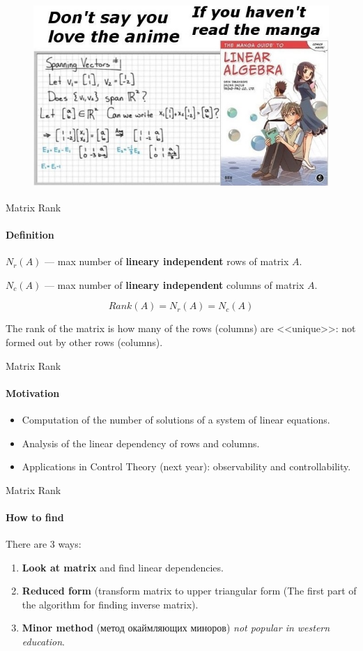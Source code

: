 \documentclass[aspectratio=169,notes]{beamer}
\begin{document}
\begin{frame}[t]{}
\framesubtitle{}
    \begin{figure}[H]
        \centering\includegraphics[height=7cm,width=1\textwidth,keepaspectratio]{agla_manga.jpeg}
        \label{fig:agla_manga.jpeg}
    \end{figure}
\end{frame}

\begin{frame}[t]{Matrix Rank}
\framesubtitle{Definition}
    \textbf{$N_r(A)$} --- max number of \textbf{lineary independent} rows of matrix $A$.

    \textbf{$N_c(A)$} --- max number of \textbf{lineary independent} columns of matrix $A$.

    \begin{equation*}
        Rank(A) = N_r(A) = N_c(A)
    \end{equation*}
\bigskip

    \centering
    The rank of the matrix is how many of the rows (columns) are <<unique>>: not formed out by other rows (columns).
\end{frame}

\begin{frame}[t]{Matrix Rank}
\framesubtitle{Motivation}
    \begin{itemize}
        \item Computation of the number of solutions of a system of linear equations.
        \item Analysis of the linear dependency of rows and columns.
        \item Applications in Control Theory (next year): observability and controllability.
    \end{itemize}
\end{frame}

\begin{frame}[t]{Matrix Rank}
\framesubtitle{How to find}
    There are 3 ways:
    \begin{enumerate}
        \item \textbf{Look at matrix} and find linear dependencies.
        \item \textbf{Reduced form} (transform matrix to upper triangular form (The first part of the algorithm for finding inverse matrix).
        \item \textbf{Minor method} (метод окаймляющих миноров) \textit{not popular in western education}.
    \end{enumerate}
\end{frame}
\end{document}
